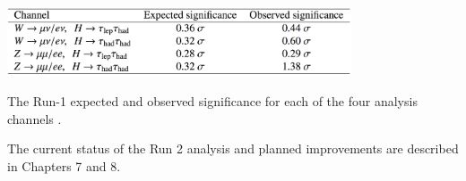 \begin{table}[htb!]
    \centering
    \includegraphics[width=4in]{figures/chapter6/run1_sig.png}
    \caption{The Run-1 expected and observed significance for each of the four analysis channels \cite{vh_run1_paper}.}
    \label{tab:run1_sig}
\end{table}

The current status of the Run 2 analysis and planned improvements are described in Chapters 7 and 8.